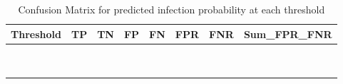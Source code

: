 \begin{table}[!h]
\centering
\caption{Confusion Matrix for predicted infection probability at each threshold}
\centering
\begin{tabular}[t]{rrrrrrrr}
\toprule
Threshold & TP & TN & FP & FN & FPR & FNR & Sum\_FPR\_FNR\\
\midrule
\cellcolor{white}{0.1} & \cellcolor{white}{65} & \cellcolor{white}{1} & \cellcolor{white}{38} & \cellcolor{white}{0} & \cellcolor{white}{0.974} & \cellcolor{white}{0.000} & \cellcolor{white}{0.974}\\
\cellcolor{gray!10}{0.2} & \cellcolor{gray!10}{64} & \cellcolor{gray!10}{2} & \cellcolor{gray!10}{37} & \cellcolor{gray!10}{1} & \cellcolor{gray!10}{0.949} & \cellcolor{gray!10}{0.015} & \cellcolor{gray!10}{0.964}\\
\cellcolor{white}{0.3} & \cellcolor{white}{64} & \cellcolor{white}{2} & \cellcolor{white}{37} & \cellcolor{white}{1} & \cellcolor{white}{0.949} & \cellcolor{white}{0.015} & \cellcolor{white}{0.964}\\
\cellcolor{gray!10}{0.4} & \cellcolor{gray!10}{62} & \cellcolor{gray!10}{7} & \cellcolor{gray!10}{32} & \cellcolor{gray!10}{3} & \cellcolor{gray!10}{0.821} & \cellcolor{gray!10}{0.046} & \cellcolor{gray!10}{0.867}\\
\cellcolor{white}{0.5} & \cellcolor{white}{51} & \cellcolor{white}{18} & \cellcolor{white}{21} & \cellcolor{white}{14} & \cellcolor{white}{0.538} & \cellcolor{white}{0.215} & \cellcolor{white}{0.754}\\
\addlinespace
\cellcolor{gray!10}{0.6} & \cellcolor{gray!10}{34} & \cellcolor{gray!10}{30} & \cellcolor{gray!10}{9} & \cellcolor{gray!10}{31} & \cellcolor{gray!10}{0.231} & \cellcolor{gray!10}{0.477} & \cellcolor{gray!10}{0.708}\\
\cellcolor{yellow}{0.7} & \cellcolor{yellow}{25} & \cellcolor{yellow}{37} & \cellcolor{yellow}{2} & \cellcolor{yellow}{40} & \cellcolor{yellow}{0.051} & \cellcolor{yellow}{0.615} & \cellcolor{yellow}{0.667}\\
\cellcolor{gray!10}{0.8} & \cellcolor{gray!10}{8} & \cellcolor{gray!10}{38} & \cellcolor{gray!10}{1} & \cellcolor{gray!10}{57} & \cellcolor{gray!10}{0.026} & \cellcolor{gray!10}{0.877} & \cellcolor{gray!10}{0.903}\\
\cellcolor{white}{0.9} & \cellcolor{white}{4} & \cellcolor{white}{38} & \cellcolor{white}{1} & \cellcolor{white}{61} & \cellcolor{white}{0.026} & \cellcolor{white}{0.938} & \cellcolor{white}{0.964}\\
\bottomrule
\end{tabular}
\end{table}
